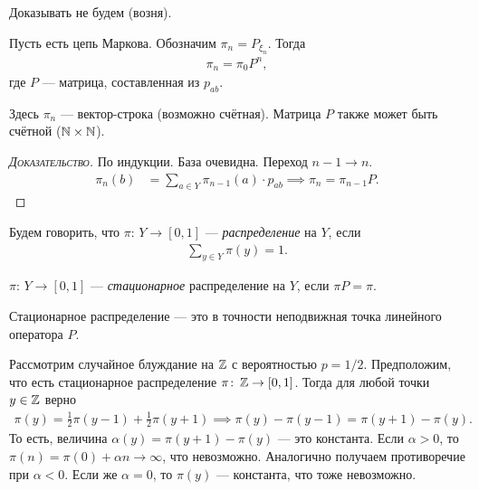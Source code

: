 \documentclass[../main.tex]{subfiles}
\begin{document}
Доказывать не будем (возня).

\begin{thm}
 Пусть есть цепь Маркова. Обозначим $ \pi_n = P_{\xi_n} $. Тогда
 \begin{align*}
  \pi_n = \pi_0 P^{n},
 \end{align*} где $ P $ --- матрица, составленная из $ p_{ab} $.
\end{thm}

Здесь $ \pi_n $ --- вектор-строка (возможно счётная). Матрица $ P $ также может быть счётной ($ \mathbb{N} \times \mathbb{N} $).

\begin{proof}[\normalfont\textsc{Доказательство}]
 По индукции. База очевидна. Переход $ n -1 \to n $.
 \begin{align*}
  \pi_n(b) &= \sum_{a \in Y} \pi_{n-1}(a) \cdot p_{ab} \implies \pi_n = \pi_{n-1} P.
 \end{align*}
\end{proof}

\begin{df}
 Будем говорить, что $ \pi \colon\, Y \to [0,1] $ --- \textit{распределение} на $ Y $, если
 \begin{align*}
  \sum_{y \in Y} \pi(y) = 1.
 \end{align*}
\end{df}
\begin{df}
 $ \pi \colon\, Y \to [0,1] $ --- \textit{стационарное} распределение на $ Y $, если $ \pi P = \pi $.
\end{df}

Стационарное распределение --- это в точности неподвижная точка линейного оператора $ P $.

\begin{exmpl}
 Рассмотрим случайное блуждание на $ \mathbb{Z} $ с вероятностью $ p = 1 / 2 $. Предположим, что есть стационарное распределение $ \pi \colon\, \mathbb{Z} \to [0,1] $. Тогда для любой точки $ y \in \mathbb{Z} $ верно
 \begin{align*}
  \pi(y) = \frac{1}{2}\pi(y-1) + \frac{1}{2}\pi(y+1) \implies \pi(y) - \pi(y-1) = \pi(y+1) - \pi(y).
 \end{align*} То есть, величина $ \alpha(y) = \pi(y+1) - \pi(y) $  --- это константа. Если $ \alpha > 0 $, то $ \pi(n) = \pi(0) + \alpha n \to \infty $, что невозможно. Аналогично получаем противоречие при $ \alpha < 0 $. Если же $ \alpha = 0 $, то $ \pi(y) $ --- константа, что тоже невозможно.
\end{exmpl}
\end{document}
